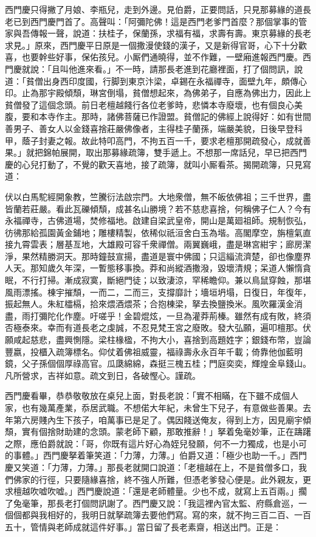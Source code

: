 西門慶只得撇了月娘、李瓶兒，走到外邊。見伯爵，正要問話，只見那募緣的道長老已到西門慶門首了。高聲叫：「阿彌陀佛！這是西門老爹門首麼？那個掌事的管家與吾傳報一聲，說道：扶桂子，保蘭孫，求福有福，求壽有壽。{}東京募緣的長老求見。」原來，西門慶平日原是一個撒漫使錢的漢子，又是新得官哥，心下十分歡喜，也要幹些好事，保佑孩兒。小厮們通曉得，並不作難，一壁廂進報西門慶。西門慶就說：「且叫他進來看。」不一時，請那長老進到花廳裡面，打了個問訊，說道：「貧僧出身西印度國，行脚到東京汴梁，卓錫在永福禪寺，面壁九年，頗傳心印。止為那宇殿傾頹，琳宮倒塌，貧僧想起來，為佛弟子，自應為佛出力，因此上貧僧發了這個念頭。前日老檀越餞行各位老爹時，悲憐本寺廢壞，也有個良心美腹，要和本寺作主。那時，諸佛菩薩已作證盟。貧僧記的佛經上說得好：如有世間善男子、善女人以金錢喜捨莊嚴佛像者，主得桂子蘭孫，端嚴美貌，日後早登科甲，蔭子封妻之報。故此特叩高門，不拘五百一千，要求老檀那開疏發心，成就善果。」就把錦帕展開，取出那募緣疏簿，雙手遞上。不想那一席話兒，早已把西門慶的心兒打動了，不覺的歡天喜地，{}接了疏簿，就叫小厮看茶。揭開疏簿，只見寫道：

伏以白馬駝經開象教，竺騰衍法啟宗門。大地衆僧，無不皈依佛祖；三千世界，盡皆蘭若莊嚴。看此瓦礫傾頹，成甚名山勝境？若不慈悲喜捨，何稱佛子仁人？今有永福禪寺，古佛道場，焚修福地。啟建自梁武皇帝，開山是萬廻祖師。規制恢弘，彷彿那給孤園黃金鋪地；雕樓精製，依稀似祇洹舍白玉為堦。高閣摩空，旃檀氣直接九霄雲表；層基亙地，大雄殿可容千衆禪僧。兩翼巍峨，盡是琳宮紺宇；廊房潔淨，果然精勝洞天。那時鐘鼓宣揚，盡道是寰中佛國；只這緇流濟楚，卻也像塵界人天。那知歲久年深，一暫態移事換。莽和尚縱酒撒潑，毀壞清規；呆道人懶惰貪眠，不行打掃。{}漸成寂寞，斷絕門徒；以致淒涼，罕稀瞻仰。兼以鳥鼠穿蝕，那堪風雨漂搖。棟宇摧頹，一而二，二而三，支撐靡計；墻垣坍塌，日復日，年復年，振起無人。朱紅櫺槅，拾來煨酒煨茶；合抱棟梁，拏去換鹽換米。風吹羅漢金消盡，雨打彌陀化作塵。吁嗟乎！金碧焜炫，一旦為灌莽荊榛。雖然有成有敗，終須否極泰來。幸而有道長老之虔誠，不忍見梵王宮之廢敗。發大弘願，遍叩檀那。伏願咸起慈悲，盡興惻隱。梁柱椽楹，不拘大小，喜捨到高題姓字；銀錢布幣，豈論豐嬴，投櫃入疏簿標名。仰仗着佛祖威靈，福祿壽永永百年千載；倚靠他伽藍明鏡，父子孫個個厚祿高官。瓜瓞綿綿，森挺三槐五桂；門庭奕奕，輝煌金阜錢山。凡所營求，吉祥如意。疏文到日，各破慳心。謹疏。

西門慶看畢，恭恭敬敬放在桌兒上面，對長老說：「實不相瞞，在下雖不成個人家，也有幾萬產業，{}忝居武職。不想偌大年紀，未曾生下兒子，有意做些善果。去年第六房賤內生下孩子，咱萬事已是足了。偶因餞送俺友，得到上方，因見廟宇傾頹，實有個捨財助建的念頭。蒙老師下顧，那敢推辭！」拏着兔毫妙筆，正在躊躇之際，應伯爵就說：「哥，你既有這片好心為姪兒發願，何不一力獨成，{}也是小可的事體。」西門慶拏着筆笑道：「力薄，力薄。」伯爵又道：「極少也助一千。」西門慶又笑道：「力薄，力薄。」那長老就開口說道：「老檀越在上，不是貧僧多口，我們佛家的行徑，只要隨緣喜捨，終不強人所難，但憑老爹發心便是。此外親友，更求檀越吹嘘吹嘘。」西門慶說道：「還是老師體量。少也不成，就寫上五百兩。」擱了兔毫筆，那長老打個問訊謝了。西門慶又說：「我這裡內官太監、府縣倉巡，一個個都與我相好的，我明日就拏疏簿去要他們寫。寫的來，就不拘三百二百、一百五十，管情與老師成就這件好事。」當日留了長老素齋，相送出門。正是：

